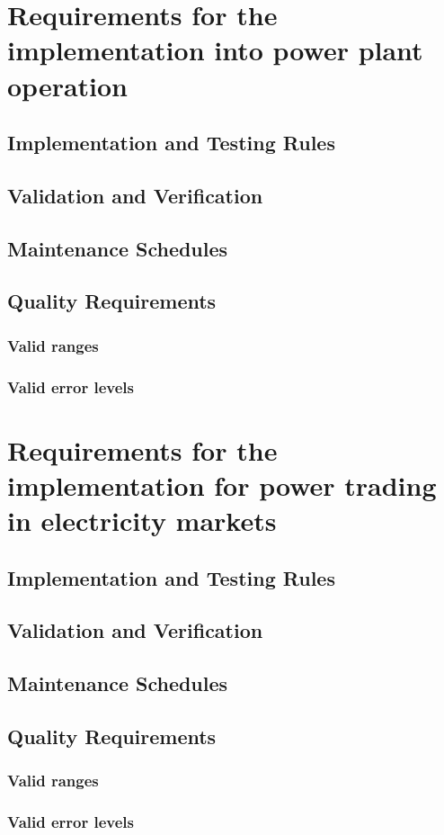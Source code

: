 \section{Requirements for the implementation into power plant operation {\color{magenta}{Contributing author: JY}}}
    \subsection{Implementation and Testing Rules }
    
    \subsection{Validation and Verification }
    
    \subsection{Maintenance Schedules }

    \subsection{Quality Requirements }\label{sec:data_quality_plant}
        
        \subsubsection{Valid ranges }\label{subsubsec:validranges}
        \subsubsection{Valid error levels }\label{subsubsec:validerrors}
    
    
\section{Requirements for the implementation for power trading in electricity markets {\color{magenta}{Contributing author: ES, COM}}}
    
    \subsection{Implementation and Testing Rules }
    \subsection{Validation and Verification }
    \subsection{Maintenance Schedules }    

    \subsection{Quality Requirements }\label{sec:data_quality_trading}
    
    \subsubsection{Valid ranges }\label{subsubsec:validranges}
    \subsubsection{Valid error levels }\label{subsubsec:validerrors}


